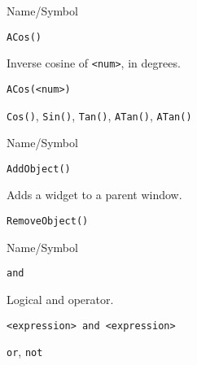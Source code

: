 \rl


\begin{desc}{Name/Symbol}

\item[Name/Symbol] 	\verb+ACos()+ 

\item[Description]  	Inverse cosine of \verb+<num>+, in degrees.

\item[Usage]
\begin{verbatim}
ACos(<num>)
\end{verbatim}

\item[Example]	

\item[See Also]    	\verb+Cos()+, \verb+Sin()+, \verb+Tan()+, \verb+ATan()+, \verb+ATan()+ 

\end{desc}

\rl
 


\begin{desc}{Name/Symbol}

\item[Name/Symbol]  	\verb+AddObject()+

\item[Description] 	Adds a widget to a parent window.

\item[Usage]		

\item[Example]	

\item[See Also]    	\verb+RemoveObject()+
\end{desc}

\rl



\begin{desc}{Name/Symbol}
\item[Name/Symbol]  	\verb+and+
  
\item[Description]  	Logical and operator.

\item[Usage]       	
\begin{verbatim}
<expression> and <expression>
\end{verbatim}

\item[Example]	

\item[See Also]     	\verb+or+, \verb+not+

\end{desc}

